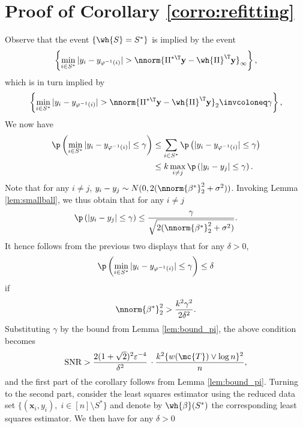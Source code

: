 \documentclass[11pt]{article}
\def\x{\mathbf{x}}
\def\y{\mathbf{y}}
\def\epss{\varepsilon}
\begin{document}
\section{Proof of Corollary \ref{corro:refitting}}

Observe that the event $\{\wh{S} = S^* \}$ is implied by the event
\begin{equation*}
\left\{ \min_{i \in S^*} |y_i - y_{\varphi^{-1}(i)}| > \nnorm{\Pi^{*\T} \y - \wh{\Pi}^{\T} \y}_{\infty} \right \},  
\end{equation*}
which is in turn implied by
\begin{equation*}
\left\{ \min_{i \in S^*} |y_i - y_{\varphi^{-1}(i)}| > \nnorm{\Pi^{*\T} \y - \wh{\Pi}^{\T} \y}_{2} \invcoloneq \gamma \right\},  
\end{equation*} 
We now have 
\begin{align*}
\p\left(\min_{i \in S^*} |y_i - y_{\varphi^{-1}(i)}| \leq \gamma \right) 
&\leq \sum_{i \in S^*} \p\left(|y_i - y_{\varphi^{-1}(i)}| \leq \gamma \right) \\
&\leq k  \max_{i \neq j} \p\left(|y_i - y_{j}| \leq \gamma \right).
\end{align*}
Note that for any $i \neq j$, $y_i - y_j \sim N(0, 2 (\nnorm{\beta^*}_2^2 + \sigma^2))$. Invoking 
Lemma \ref{lem:smallball}, we thus obtain that for any $i \neq j$ 
\begin{equation*}  
\p\left(|y_i - y_{j}| \leq \gamma \right) \leq \frac{\gamma}{\sqrt{2 (\nnorm{\beta^*}_2^2 + \sigma^2)}}.
\end{equation*}
It hence follows from the previous two displays that for any $\delta > 0$, 
\begin{equation*}
\p\left(\min_{i \in S^*} |y_i - y_{\varphi^{-1}(i)}| \leq \gamma \right) \leq \delta
\end{equation*}
if 
\begin{equation*}
\nnorm{\beta^*}_2^2 > \frac{k^2 \gamma^2}{2 \delta^2}. 
\end{equation*}
Substituting $\gamma$ by the bound from Lemma \ref{lem:bound_pi}, the above condition becomes
\begin{equation*}
\text{SNR} > \frac{2 (1 + \sqrt{2})^2 \epss^{-4}}{\delta^2}\,\cdot \frac{k^2  \{w(\mc{T}) \vee \log n\}^2}{n },
\end{equation*}    
and the first part of the corollary follows from Lemma \ref{lem:bound_pi}. Turning to the second part, consider
the least squares estimator using the reduced data set $\{(\x_i, y_i), \; i \in [n] \setminus S^* \}$ and denote
by $\wh{\beta}(S^*)$ the corresponding least squares estimator. We then have for any $\delta > 0$ 
\end{document}
